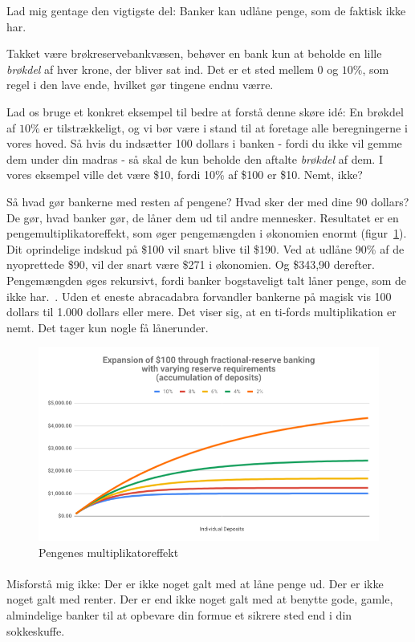 \documentclass[paper=6in:9in,pagesize=pdftex,headinclude=on,footinclude=on,12pt]{scrbook}
\begin{document}
Lad mig gentage den vigtigste del: Banker kan udlåne penge, som de faktisk ikke har.

Takket være brøkreservebankvæsen, behøver en bank kun at beholde en lille \textit{brøkdel} af hver krone, der bliver sat ind. Det er et sted mellem $0$ og $10\%$, som regel i den lave ende, hvilket gør tingene endnu værre.

Lad os bruge et konkret eksempel til bedre at forstå denne skøre id\'e: En brøkdel af $10\%$ er tilstrækkeligt, og vi bør være i stand til at foretage alle beregningerne i vores hoved. Så hvis du indsætter 100 dollars i banken - fordi du ikke vil gemme dem under din madras - så skal de kun beholde den aftalte \textit{brøkdel} af dem. I vores eksempel ville det være \$10, fordi 10\% af \$100 er \$10. Nemt, ikke?

Så hvad gør bankerne med resten af pengene? Hvad sker der med dine 90 dollars? De gør, hvad banker gør, de låner dem ud til andre mennesker. Resultatet er en pengemultiplikatoreffekt, som øger pengemængden i økonomien enormt (figur~\ref{fig:money-multiplier}). Dit oprindelige indskud på \$100 vil snart blive til \$190. Ved at udlåne 90\% af de nyoprettede \$90, vil der snart være \$271 i økonomien. Og \$343,90 derefter. Pengemængden øges rekursivt, fordi banker bogstaveligt talt låner penge, som de ikke har.~\cite{wiki:money-multiplier}. Uden et eneste abracadabra forvandler bankerne på magisk vis 100 dollars til 1.000 dollars eller mere. Det viser sig, at en ti-fords multiplikation er nemt. Det tager kun nogle få lånerunder.\begin{figure}
  \centering
  \includegraphics{assets/images/money-multiplier.png}
  \caption{Pengenes multiplikatoreffekt}
  \label{fig:money-multiplier}
\end{figure}

\paragraph{} Misforstå mig ikke: Der er ikke noget galt med at låne penge ud. Der er ikke noget galt med renter. Der er end ikke noget galt med at benytte gode, gamle, almindelige banker til at opbevare din formue et sikrere sted end i din sokkeskuffe.
\end{document}
